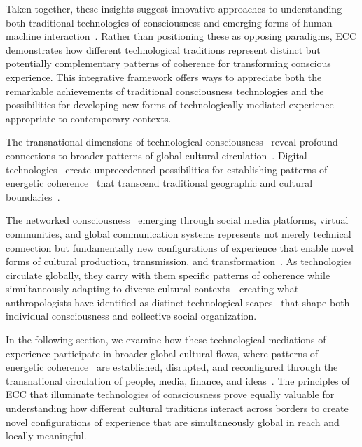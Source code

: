 Taken together, these insights suggest innovative approaches to understanding both traditional technologies of consciousness and emerging forms of human-machine interaction~\cite{verbeek2005what,latour2005reassembling}. Rather than positioning these as opposing paradigms, ECC demonstrates how different technological traditions represent distinct but potentially complementary patterns of coherence for transforming conscious experience. This integrative framework offers ways to appreciate both the remarkable achievements of traditional consciousness technologies and the possibilities for developing new forms of technologically-mediated experience appropriate to contemporary contexts.

The transnational dimensions of technological consciousness~ reveal profound connections to broader patterns of global cultural circulation~\cite{castells2010rise,appadurai1996modernity}. Digital technologies~ create unprecedented possibilities for establishing patterns of energetic coherence~ that transcend traditional geographic and cultural boundaries~\cite{hayles2012how,pink2016digital}.

The networked consciousness~ emerging through social media platforms, virtual communities, and global communication systems represents not merely technical connection but fundamentally new configurations of experience that enable novel forms of cultural production, transmission, and transformation~\cite{horst2012digital,boyer2015digital}. As technologies circulate globally, they carry with them specific patterns of coherence while simultaneously adapting to diverse cultural contexts—creating what anthropologists have identified as distinct technological scapes~\cite{appadurai1996modernity,hannerz1996transnational} that shape both individual consciousness and collective social organization.

In the following section, we examine how these technological mediations of experience participate in broader global cultural flows, where patterns of energetic coherence~ are established, disrupted, and reconfigured through the transnational circulation of people, media, finance, and ideas~\cite{tsing2005friction,kraidy2005hybridity}. The principles of ECC that illuminate technologies of consciousness prove equally valuable for understanding how different cultural traditions interact across borders to create novel configurations of experience that are simultaneously global in reach and locally meaningful.
